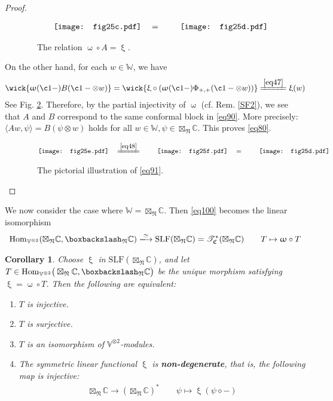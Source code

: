\documentclass[11pt,b5paper,notitlepage]{article}
\theoremstyle{definition}
\theoremstyle{plain}
\newtheorem{co}[df]{Corollary}
\newcommand{\fk}{\mathfrak}
\newcommand{\Hom}{\mathrm{Hom}}
\newcommand{\SLF}{\mathrm{SLF}}
\newcommand{\Vbb}{\mathbb V}
\newcommand{\Wbb}{\mathbb W}
\newcommand{\Cbb}{\mathbb C}
\newcommand{\<}{\left\langle}
\renewcommand{\>}{\right\rangle}
\newcommand{\ST}{\mathscr{T}}
\newcommand{\bk}[1]{\langle {#1}\rangle}
\newcommand{\bbs}{\boxbackslash}
\newcommand{\fn}{\mathfrak{N}}
\numberwithin{equation}{section}
\begin{document}
\begin{proof}
\begin{figure}[h]
	\centering
\begin{align*}
\quad\vcenter{\hbox{{
				   \texttt{[image: fig25c.pdf]}}}}
\quad=\quad
\quad\vcenter{\hbox{{
				   \texttt{[image: fig25d.pdf]}}}}
\end{align*}
\caption{~~The relation $\upomega\circ A=\upxi$.}
	\label{img9}
\end{figure}
On the other hand, for each $w\in\Wbb$, we have
\begin{align}\label{eq91}
\wick{\upomega(\c1-)B(\c1-\otimes w)}=\wick{\upxi\circ(\upomega(\c1-)\Phi_{+,+}(\c1-\otimes w))}\xlongequal{\eqref{eq47}}\upxi(w)
\end{align}
See Fig. \ref{img10}. Therefore, by the partial injectivity of $\upomega$ (cf. Rem. \ref{SF2}), we see that $A$ and $B$ correspond to the same conformal block in \eqref{eq90}. More precisely: $\bk{Aw,\psi}=B(\psi\otimes w)$ holds for all $w\in\Wbb,\psi\in\boxtimes_\fn\Cbb$. This proves \eqref{eq80}.
\begin{figure}[h]
	\centering
\begin{align*}
\quad\vcenter{\hbox{{
				   \texttt{[image: fig25e.pdf]}}}}
\quad\xlongequal{\eqref{eq48}}\quad
\quad\vcenter{\hbox{{
				   \texttt{[image: fig25f.pdf]}}}}
\quad=\quad
\quad\vcenter{\hbox{{
				   \texttt{[image: fig25d.pdf]}}}}
\end{align*}
\caption{~~The pictorial illustration of \eqref{eq91}.}
	\label{img10}
\end{figure}
\end{proof}

We now consider the case where $\Wbb=\boxtimes_\fn\Cbb$. Then \eqref{eq100} becomes the linear isomorphism
\begin{align}\label{eq101}
\Hom_{\Vbb^{\otimes 2}}(\boxtimes_\fn\Cbb,\bbs_\fn\Cbb)\xlongrightarrow{\simeq}\SLF(\boxtimes_\fn\Cbb)=\ST^*_{\fk C}(\boxtimes_\fn\Cbb)\qquad T\mapsto \upomega\circ T
\end{align}

\begin{co}\label{lb63}
Choose $\upxi$ in $\SLF(\boxtimes_\fn\Cbb)$, and let $T\in \Hom_{\Vbb^{\otimes 2}}\big(\boxtimes_\fn\Cbb,\bbs_\fn\Cbb \big)$ be the unique morphism satisfying $\upxi=\upomega\circ T$. Then the following are equivalent:
\begin{enumerate}[label=(\alph*)]
\item $T$ is injective.
\item $T$ is surjective.
\item $T$ is an isomorphism of $\Vbb^{\otimes2}$-modules.
\item The symmetric linear functional $\upxi$ is \textbf{non-degenerate}, that is, the following map is injective:
\begin{align}
\boxtimes_\fn\Cbb\rightarrow(\boxtimes_\fn\Cbb)^*\qquad \psi\mapsto\upxi(\psi\diamond-)
\end{align}
\end{enumerate}
\end{co}
\end{document}
